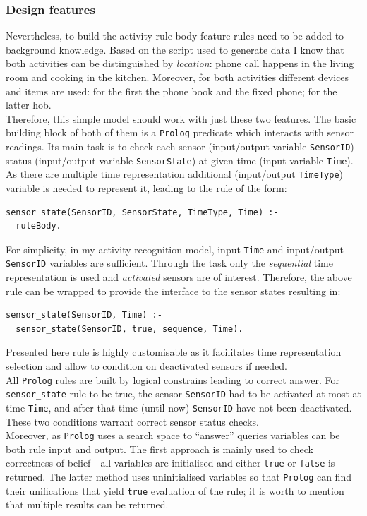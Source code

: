 \documentclass[10pt, a4paper, pdflatex, leqno, twoside, openright]{report}
\begin{document}
      \subsubsection{Design features}
Nevertheless, to build the activity rule body feature rules need to be added to background knowledge. Based on the script used to generate data I know that both activities can be distinguished by \emph{location}: phone call happens in the living room and cooking in the kitchen. Moreover, for both activities different devices and items are used: for the first the phone book and the fixed phone; for the latter hob.\\

Therefore, this simple model should work with just these two features. The basic building block of both of them is a \texttt{Prolog} predicate which interacts with sensor readings. Its main task is to check each sensor (input/output variable \texttt{SensorID}) status (input/output variable \texttt{SensorState}) at given time (input variable \texttt{Time}). As there are multiple time representation additional (input/output \texttt{TimeType}) variable is needed to represent it, leading to the rule of the form:\\
\begin{verbatim}
sensor_state(SensorID, SensorState, TimeType, Time) :-
  ruleBody.
\end{verbatim}
For simplicity, in my activity recognition model, input \texttt{Time} and input/output \texttt{SensorID} variables are sufficient. Through the task only the \emph{sequential} time representation is used and \emph{activated} sensors are of interest. Therefore, the above rule can be wrapped to provide the interface to the sensor states resulting in:\\
\begin{verbatim}
sensor_state(SensorID, Time) :-
  sensor_state(SensorID, true, sequence, Time).
\end{verbatim}
Presented here rule is highly customisable as it facilitates time representation selection and allow to condition on deactivated sensors if needed.\\
All \texttt{Prolog} rules are built by logical constrains leading to correct answer. For \texttt{sensor\_state} rule to be true, the sensor \texttt{SensorID} had to be activated at most at time \texttt{Time}, and after that time (until now) \texttt{SensorID} have not been deactivated. These two conditions warrant correct sensor status checks.\\
Moreover, as \texttt{Prolog} uses a search space to ``answer'' queries variables can be both rule input and output. The first approach is mainly used to check correctness of belief---all variables are initialised and either \texttt{true} or \texttt{false} is returned. The latter method uses uninitialised variables so that \texttt{Prolog} can find their unifications that yield \texttt{true} evaluation of the rule; it is worth to mention that multiple results can be returned.\\
\end{document}
